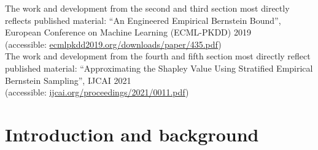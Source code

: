 The work and development from the second and third section most directly reflects published material: ``An Engineered Empirical Bernstein Bound'',\\ European Conference on Machine Learning (ECML-PKDD) 2019\\(accessible: \href{http://ecmlpkdd2019.org/downloads/paper/435.pdf}{ecmlpkdd2019.org/downloads/paper/435.pdf})\\
The work and development from the fourth and fifth section most directly reflect published material: ``Approximating the Shapley Value Using Stratified Empirical Bernstein Sampling'', IJCAI 2021\\
(accessible: \href{https://www.ijcai.org/proceedings/2021/0011.pdf}{ijcai.org/proceedings/2021/0011.pdf})\\







\section{Introduction and background}\label{sec:sampling_background}



